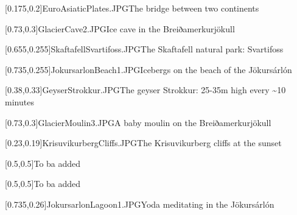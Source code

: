 



\graphicspath{{Figures/}{Figures/Iceland/}}


\subtitle{Day 2}
\date{27.10.2020}


    
    [0.175,0.2]{EuroAsiaticPlates.JPG}{The bridge between two continents}
    
    [0.73,0.3]{GlacierCave2.JPG}{Ice cave in the Breiðamerkurj\"okull}
    
    [0.655,0.255]{SkaftafellSvartifoss.JPG}{The Skaftafell natural park: Svartifoss}
    
    [0.735,0.255]{JokursarlonBeach1.JPG}{Icebergs on the beach of the J\"okurs\'arl\'on}
    
    [0.38,0.33]{GeyserStrokkur.JPG}{The geyser Strokkur: 25-35m high every \textasciitilde10 minutes}
    
    [0.73,0.3]{GlacierMoulin3.JPG}{A baby moulin on the Breiðamerkurj\"okull}
    
    [0.23,0.19]{KrisuvikurbergCliffs.JPG}{The Krisuvikurberg cliffs at the sunset}
    
    
    [0.5,0.5]{}{To ba added}
    
    [0.5,0.5]{}{To ba added}
    
    [0.735,0.26]{JokursarlonLagoon1.JPG}{Yoda meditating in the J\"okurs\'arl\'on}
    

